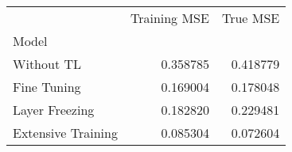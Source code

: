 \begin{tabular}{lrr}
\toprule
 & Training MSE & True MSE \\
Model &  &  \\
\midrule
Without TL & 0.358785 & 0.418779 \\
Fine Tuning & 0.169004 & 0.178048 \\
Layer Freezing & 0.182820 & 0.229481 \\
Extensive Training & 0.085304 & 0.072604 \\
\bottomrule
\end{tabular}
